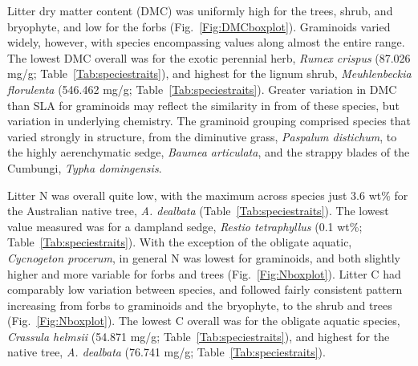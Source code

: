 \documentclass{article}
\begin{document}
Litter dry matter content (DMC) was uniformly high for the trees, shrub, and bryophyte, and low for the forbs (Fig.~\ref{Fig:DMCboxplot}). Graminoids varied widely, however, with species encompassing values along almost the entire range. The lowest DMC overall was for the exotic perennial herb, \textit{Rumex crispus} (87.026 mg/g; Table~\ref{Tab:speciestraits}), and highest for the lignum shrub, \textit{Meuhlenbeckia florulenta} (546.462 mg/g; Table~\ref{Tab:speciestraits}). Greater variation in DMC than SLA for graminoids may reflect the similarity in from of these species, but variation in underlying chemistry. The graminoid grouping comprised species that varied strongly in structure, from the diminutive grass, \textit{Paspalum distichum}, to the highly aerenchymatic sedge, \textit{Baumea articulata}, and the strappy blades of the Cumbungi, \textit{Typha domingensis}.

Litter N was overall quite low, with the maximum across species just 3.6 wt\% for the Australian native tree, \textit{A. dealbata} (Table~\ref{Tab:speciestraits}). The lowest value measured was for a dampland sedge, \textit{Restio tetraphyllus} (0.1 wt\%; Table~\ref{Tab:speciestraits}). With the exception of the obligate aquatic, \textit{Cycnogeton procerum}, in general N was lowest for graminoids, and both slightly higher and more variable for forbs and trees (Fig.~\ref{Fig:Nboxplot}). Litter C had comparably low variation between species, and followed fairly consistent pattern increasing from forbs to graminoids and the bryophyte, to the shrub and trees (Fig.~\ref{Fig:Nboxplot}). The lowest C overall was for the obligate aquatic species, \textit{Crassula helmsii} (54.871 mg/g; Table~\ref{Tab:speciestraits}), and highest for the native tree, \textit{A. dealbata} (76.741 mg/g; Table~\ref{Tab:speciestraits}). 
\end{document}
